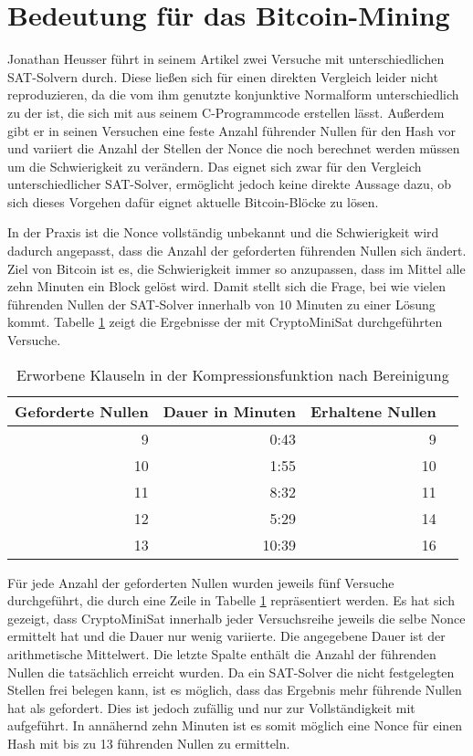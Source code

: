 \section{Bedeutung für das Bitcoin-Mining}

Jonathan Heusser führt in seinem Artikel \cite{jona:1} zwei Versuche mit unterschiedlichen SAT-Solvern durch.
Diese ließen sich für einen direkten Vergleich leider nicht reproduzieren, da die vom ihm genutzte konjunktive
Normalform unterschiedlich zu der ist, die sich mit  aus seinem C-Programmcode erstellen lässt.
Außerdem gibt er in seinen Versuchen eine feste Anzahl führender Nullen für den Hash vor und variiert die
Anzahl der Stellen der Nonce die noch berechnet werden müssen um die Schwierigkeit zu verändern. Das eignet
sich zwar für den Vergleich unterschiedlicher SAT-Solver, ermöglicht jedoch keine direkte Aussage dazu, ob
sich dieses Vorgehen dafür eignet aktuelle Bitcoin-Blöcke zu lösen.

In der Praxis ist die Nonce vollständig unbekannt und die Schwierigkeit wird dadurch angepasst, dass die Anzahl
der geforderten führenden Nullen sich ändert. Ziel von Bitcoin ist es, die Schwierigkeit immer so anzupassen, dass im Mittel
alle zehn Minuten ein Block gelöst wird. Damit stellt sich die Frage, bei wie vielen führenden Nullen der SAT-Solver
innerhalb von 10 Minuten zu einer Lösung kommt. Tabelle \ref{fig:bitcoinzeros} zeigt die Ergebnisse der mit CryptoMiniSat
durchgeführten Versuche.

\begin{table}[!h]
  \centering
  \begin{tabular}{rr|rr}
    Geforderte Nullen & Dauer in Minuten & Erhaltene Nullen \\
    \hline
     9 &  0:43 &  9 \\
    10 &  1:55 & 10 \\
    11 &  8:32 & 11 \\
    12 &  5:29 & 14 \\
    13 & 10:39 & 16
  \end{tabular}
  \caption{Erworbene Klauseln in der Kompressionsfunktion nach Bereinigung}
  \label{fig:bitcoinzeros}
\end{table}

Für jede Anzahl der geforderten Nullen wurden jeweils fünf Versuche durchgeführt, die durch eine Zeile in Tabelle \ref{fig:bitcoinzeros}
repräsentiert werden. Es hat sich gezeigt, dass CryptoMiniSat innerhalb jeder Versuchsreihe jeweils die selbe Nonce ermittelt hat
und die Dauer nur wenig variierte. Die angegebene Dauer ist der arithmetische Mittelwert. Die letzte Spalte enthält die Anzahl der
führenden Nullen die tatsächlich erreicht wurden. Da ein SAT-Solver die nicht festgelegten Stellen frei belegen kann, ist es möglich,
dass das Ergebnis mehr führende Nullen hat als gefordert. Dies ist jedoch zufällig und nur zur Vollständigkeit mit aufgeführt.
In annähernd zehn Minuten ist es somit möglich eine Nonce für einen Hash mit bis zu 13 führenden Nullen zu ermitteln.

